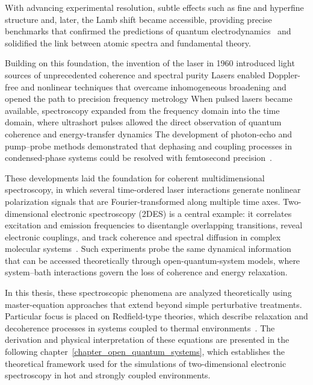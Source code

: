 \noindent
With advancing experimental resolution, subtle effects such as fine and hyperfine structure and, later, the Lamb shift became accessible, providing precise benchmarks that confirmed the predictions of quantum electrodynamics~\cite{lambretherford1947finestructurehydrogen, bethe1947electromagneticshiftenergy, hansch2006nobellecturepassion} and solidified the link between atomic spectra and fundamental theory.

Building on this foundation, the invention of the laser in 1960 introduced light sources of unprecedented coherence and spectral purity %
Lasers enabled Doppler-free and nonlinear techniques that overcame inhomogeneous broadening and opened the path to precision frequency metrology%
When pulsed lasers became available, spectroscopy expanded from the frequency domain into the time domain, where ultrashort pulses allowed the direct observation of quantum coherence and energy-transfer dynamics%
The development of photon-echo and pump–probe methods demonstrated that dephasing and coupling processes in condensed-phase systems could be resolved with femtosecond precision~\cite{mukamel1995principlesnonlinearoptical, cho2009twodimensionalopticalspectroscopy}.

These developments laid the foundation for coherent multidimensional spectroscopy, in which several time-ordered laser interactions generate nonlinear polarization signals that are Fourier-transformed along multiple time axes.
Two-dimensional electronic spectroscopy (2DES) is a central example: it correlates excitation and emission frequencies to disentangle overlapping transitions, reveal electronic couplings, and track coherence and spectral diffusion in complex molecular systems~\cite{jonas2003twodimensionalfemtosecondspectroscopy, hamm2005principlesnonlinearoptical, cho2009twodimensionalopticalspectroscopy, mukamel1995principlesnonlinearoptical, boyd2008contents}.
Such experiments probe the same dynamical information that can be accessed theoretically through open-quantum-system models, where system–bath interactions govern the loss of coherence and energy relaxation. 

In this thesis, these spectroscopic phenomena are analyzed theoretically using master-equation approaches that extend beyond simple perturbative treatments.
Particular focus is placed on Redfield-type theories, which describe relaxation and decoherence processes in systems coupled to thermal environments~\cite{redfield1957theory, breuer2002theoryopenquantum, may2011quantum}.
The derivation and physical interpretation of these equations are presented in the following chapter~\ref{chapter_open_quantum_systems}, which establishes the theoretical framework used for the simulations of two-dimensional electronic spectroscopy in hot and strongly coupled environments.


